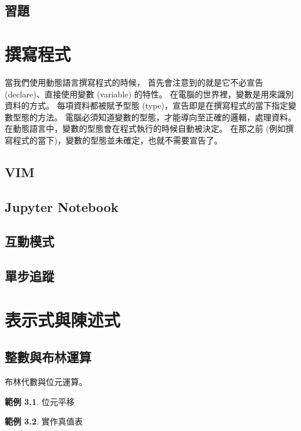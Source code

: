 \documentclass[a4paper,12pt]{book}
\theoremstyle{definition}
\newtheorem{example}{範例}[chapter]
\begin{document}
\section{習題}

\chapter{撰寫程式}
%
\label{c:write}

當我們使用動態語言撰寫程式的時候，
首先會注意到的就是它不必宣告 (declare)、直接使用變數 (variable) 的特性。
在電腦的世界裡，變數是用來識別資料的方式。
每項資料都被賦予型態 (type)，宣告即是在撰寫程式的當下指定變數型態的方法。
電腦必須知道變數的型態，才能導向至正確的邏輯，處理資料。
在動態語言中，變數的型態會在程式執行的時候自動被決定。
在那之前 (例如撰寫程式的當下)，變數的型態並未確定，也就不需要宣告了。

\section{VIM}

\section{Jupyter Notebook}

\section{互動模式}

\section{單步追蹤}

\chapter{表示式與陳述式}
%
\label{c:arithmic}

\section{整數與布林運算}

布林代數與位元運算。

\begin{example}
位元平移
\end{example}

\begin{example}
實作真值表
\end{example}
\end{document}
